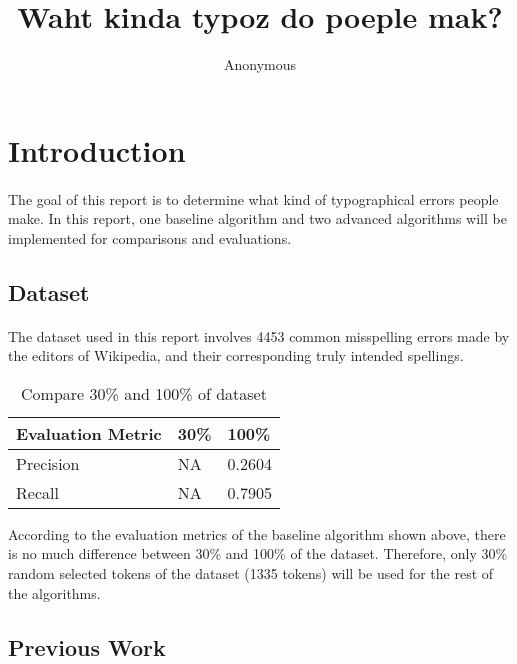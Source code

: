 \documentclass[11pt]{article}
\title{Waht kinda typoz do poeple mak?}
\author
{Anonymous}
\begin{document}
\maketitle


\section{Introduction}

\paragraph{} The goal of this report is to determine what kind of typographical errors people make. In this report, one baseline algorithm and two advanced algorithms will be implemented for comparisons and evaluations.

\subsection{Dataset}

\paragraph{} The dataset used in this report involves 4453 common misspelling errors made by the editors of Wikipedia, and their corresponding truly intended spellings.

\begin{table}[h]
 \begin{center}
\begin{tabular}{| l | l | l |}

      \hline
      Evaluation Metric & 30\% & 100\% \\
      \hline\hline
      Precision & NA & 0.2604 \\
      Recall & NA & 0.7905 \\
      \hline

\end{tabular}
\caption{Compare 30\% and 100\% of dataset}\label{table1}
 \end{center}
\end{table}

According to the evaluation metrics of the baseline algorithm shown above, there is no much difference between 30\% and 100\% of the dataset. Therefore, only 30\% random selected tokens of the dataset (1335 tokens) will be used for the rest of the algorithms.

\subsection{Previous Work}
\end{document}

